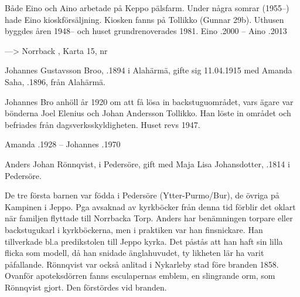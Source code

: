 Både Eino och Aino arbetade på Keppo pälsfarm. Under några somrar (1955--) hade Eino kioskförsäljning. Kiosken fanns på Tollikko (Gunnar 29b). Uthusen byggdes åren 1948-- och huset grundrenoverades 1981.
Eino .2000  --  Aino .2013




---> Norrback ,	Karta 15,  nr 


Johannes Gustavsson Broo, .1894 i Alahärmä, gifte sig 11.04.1915 med Amanda Saha, .1896,  från Alahärmä.
\begin{jhchildren}
  \item {}
  \item {}
  \item {}
  \item {}
\end{jhchildren}
Johannes Bro anhöll år 1920 om att få lösa in backstuguområdet, vars ägare var bönderna Joel Elenius och Johan Andersson Tollikko. Han löste in området och befriades från dagsverksskyldigheten. Huset revs 1947.

Amanda .1928  --  Johannes .1970


Anders Johan Rönnqvist,  i Pedersöre, gift med Maja Lisa Johansdotter, .1814 i Pedersöre.
\begin{jhchildren}
  \item {}
  \item {}
  \item {}
  \item {}
  \item {}
  \item {}
  \item {}
  \item {}
\end{jhchildren}
De tre första barnen var födda i Pedersöre (Ytter-Purmo/Bur), de övriga på Kampinen i Jeppo. Pga avsaknad av kyrkböcker från denna tid förblir det oklart när familjen flyttade till Norrbacka Torp. Anders har benämningen torpare eller backstugukarl i kyrkböckerna, men i praktiken var han finsnickare. Han tillverkade bl.a predikstolen till Jeppo kyrka. Det påstås att han haft sin lilla flicka som modell, då han snidade änglahuvudet, ty likheten lär ha varit påfallande. Rönnqvist var också anlitad i Nykarleby stad före branden 1858. Ovanför apoteksdörren fanns esculapernas emblem, en slingrande orm, som Rönnqvist gjort. Den förstördes vid branden.

